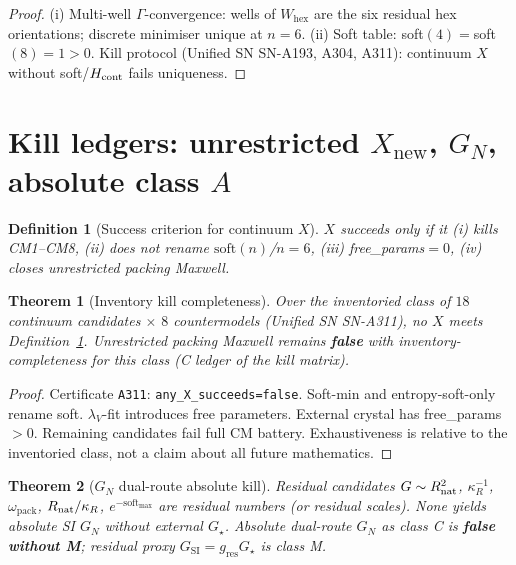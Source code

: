 \documentclass[11pt,a4paper]{article}
\newtheorem{theorem}{Theorem}
\newtheorem{definition}{Definition}
\theoremstyle{remark}
\begin{document}
\begin{proof}
(i) Multi-well $\Gamma$-convergence: wells of $W_{\mathrm{hex}}$ are the six residual hex orientations; discrete minimiser unique at $n=6$.
(ii) Soft table: soft$(4)=$soft$(8)=1>0$. Kill protocol (Unified SN SN-A193, A304, A311): continuum $X$ without soft/$H_{\rm cont}$ fails uniqueness.
\end{proof}

\section{Kill ledgers: unrestricted $X_{\mathrm{new}}$, $G_N$, absolute class $A$}
\label{sec:kills}

\begin{definition}[Success criterion for continuum $X$]
\label{def:Xsuccess}
$X$ succeeds only if it (i) kills CM1--CM8, (ii) does not rename $\mathrm{soft}(n)$/$n{=}6$, (iii) free\_params${=}0$, (iv) closes unrestricted packing Maxwell.
\end{definition}

\begin{theorem}[Inventory kill completeness]
\label{thm:Xnew}
Over the inventoried class of $18$ continuum candidates $\times$ $8$ countermodels (Unified SN SN-A311), no $X$ meets Definition~\ref{def:Xsuccess}. Unrestricted packing Maxwell remains \textbf{false} with inventory-completeness for this class (C ledger of the kill matrix).
\end{theorem}

\begin{proof}
Certificate \texttt{A311}: \texttt{any\_X\_succeeds=false}. Soft-min and entropy-soft-only rename soft. $\lambda_V$-fit introduces free parameters. External crystal has free\_params${>}0$. Remaining candidates fail full CM battery. Exhaustiveness is relative to the inventoried class, not a claim about all future mathematics.
\end{proof}

\begin{theorem}[$G_N$ dual-route absolute kill]
\label{thm:GN}
Residual candidates $G\sim R_{\rm nat}^2$, $\kappa_R^{-1}$, $\omega_{\mathrm{pack}}$, $R_{\rm nat}/\kappa_R$, $e^{-\mathrm{soft}_{\max}}$ are residual numbers (or residual scales). None yields absolute SI $G_N$ without external $G_\star$. Absolute dual-route $G_N$ as class C is \textbf{false without M}; residual proxy $G_{\mathrm{SI}}=g_{\mathrm{res}}G_\star$ is class M.
\end{theorem}
\end{document}
